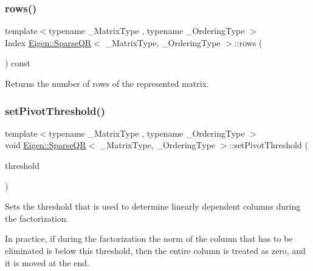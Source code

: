 \subsubsection{\texorpdfstring{rows()}{rows()}}
{\footnotesize\ttfamily template$<$typename \+\_\+\+Matrix\+Type , typename \+\_\+\+Ordering\+Type $>$ \\
Index \mbox{\hyperlink{class_eigen_1_1_sparse_q_r}{Eigen\+::\+Sparse\+QR}}$<$ \+\_\+\+Matrix\+Type, \+\_\+\+Ordering\+Type $>$\+::rows (\begin{DoxyParamCaption}\item[{void}]{ }\end{DoxyParamCaption}) const\hspace{0.3cm}{\ttfamily [inline]}}

\begin{DoxyReturn}{Returns}
the number of rows of the represented matrix. 
\end{DoxyReturn}
\mbox{\label{class_eigen_1_1_sparse_q_r_adb7bfa65f99e3ef91ed58ea663a850a1}} 
\subsubsection{\texorpdfstring{setPivotThreshold()}{setPivotThreshold()}}
{\footnotesize\ttfamily template$<$typename \+\_\+\+Matrix\+Type , typename \+\_\+\+Ordering\+Type $>$ \\
void \mbox{\hyperlink{class_eigen_1_1_sparse_q_r}{Eigen\+::\+Sparse\+QR}}$<$ \+\_\+\+Matrix\+Type, \+\_\+\+Ordering\+Type $>$\+::set\+Pivot\+Threshold (\begin{DoxyParamCaption}\item[{const Real\+Scalar \&}]{threshold }\end{DoxyParamCaption})\hspace{0.3cm}{\ttfamily [inline]}}

Sets the threshold that is used to determine linearly dependent columns during the factorization.

In practice, if during the factorization the norm of the column that has to be eliminated is below this threshold, then the entire column is treated as zero, and it is moved at the end. \mbox{\label{class_eigen_1_1_sparse_q_r_aea13a2c6823cd8408ba49afde9b3d4e4}} 
